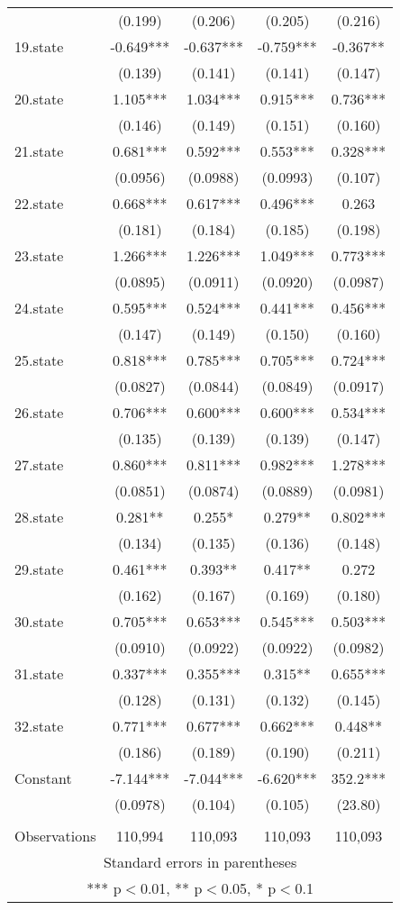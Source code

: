 \documentclass[]{article}
\begin{document}
\begin{tabular}{lcccc}
 & (0.199) & (0.206) & (0.205) & (0.216) \\
19.state & -0.649*** & -0.637*** & -0.759*** & -0.367** \\
 & (0.139) & (0.141) & (0.141) & (0.147) \\
20.state & 1.105*** & 1.034*** & 0.915*** & 0.736*** \\
 & (0.146) & (0.149) & (0.151) & (0.160) \\
21.state & 0.681*** & 0.592*** & 0.553*** & 0.328*** \\
 & (0.0956) & (0.0988) & (0.0993) & (0.107) \\
22.state & 0.668*** & 0.617*** & 0.496*** & 0.263 \\
 & (0.181) & (0.184) & (0.185) & (0.198) \\
23.state & 1.266*** & 1.226*** & 1.049*** & 0.773*** \\
 & (0.0895) & (0.0911) & (0.0920) & (0.0987) \\
24.state & 0.595*** & 0.524*** & 0.441*** & 0.456*** \\
 & (0.147) & (0.149) & (0.150) & (0.160) \\
25.state & 0.818*** & 0.785*** & 0.705*** & 0.724*** \\
 & (0.0827) & (0.0844) & (0.0849) & (0.0917) \\
26.state & 0.706*** & 0.600*** & 0.600*** & 0.534*** \\
 & (0.135) & (0.139) & (0.139) & (0.147) \\
27.state & 0.860*** & 0.811*** & 0.982*** & 1.278*** \\
 & (0.0851) & (0.0874) & (0.0889) & (0.0981) \\
28.state & 0.281** & 0.255* & 0.279** & 0.802*** \\
 & (0.134) & (0.135) & (0.136) & (0.148) \\
29.state & 0.461*** & 0.393** & 0.417** & 0.272 \\
 & (0.162) & (0.167) & (0.169) & (0.180) \\
30.state & 0.705*** & 0.653*** & 0.545*** & 0.503*** \\
 & (0.0910) & (0.0922) & (0.0922) & (0.0982) \\
31.state & 0.337*** & 0.355*** & 0.315** & 0.655*** \\
 & (0.128) & (0.131) & (0.132) & (0.145) \\
32.state & 0.771*** & 0.677*** & 0.662*** & 0.448** \\
 & (0.186) & (0.189) & (0.190) & (0.211) \\
Constant & -7.144*** & -7.044*** & -6.620*** & 352.2*** \\
 & (0.0978) & (0.104) & (0.105) & (23.80) \\
 &  &  &  &  \\
 Observations & 110,994 & 110,093 & 110,093 & 110,093 \\ \hline
\multicolumn{5}{c}{ Standard errors in parentheses} \\
\multicolumn{5}{c}{ *** p$<$0.01, ** p$<$0.05, * p$<$0.1} \\
\end{tabular}
\end{document}
